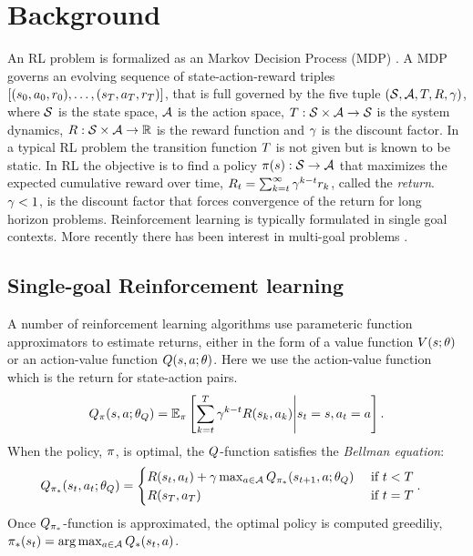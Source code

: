 \section{Background}

An RL problem is formalized as an Markov Decision Process (MDP)
\citep{sutton1998reinforcement}. A MDP governs
an evolving sequence of state-action-reward triples $[(s_0, a_0,
r_0), \dots, (s_T, a_T, r_T)]$, that is full governed
by the five tuple $(\mathcal{S}, \mathcal{A}, T, R, \gamma)$, where $\mathcal{S}$ is the
state space, $\mathcal{A}$ is the action space, $T : \mathcal{S} \times \mathcal{A}
\rightarrow \mathcal{S}$ is the system dynamics, $R : \mathcal{S} \times \mathcal{A}
\rightarrow \mathbb{R} $ is the reward function and $\gamma$ is the discount
factor.
In a typical RL problem the transition function $T$ is not given but is
known to be static.
In RL the objective is to find a policy $\pi(s): \mathcal{S}
\rightarrow \mathcal{A}$ that
maximizes the expected cumulative
reward over time, $R_t = \sum_{k=t}^{\infty} \gamma^{k-t}r_{k}$, called the
\emph{return}. $\gamma < 1$, is the discount factor that forces
convergence of the return for long horizon problems. 
Reinforcement learning is typically formulated in single goal
contexts. More recently there has been interest in multi-goal
problems
\citep{andrychowicz2017hindsight,pong2018temporal,plappert2018multi}.


\subsection{Single-goal Reinforcement learning}

A number of reinforcement learning algorithms use parameteric function
approximators to estimate returns, either in the form of a value function
$V(s; \theta)$ or an action-value function $Q(s, a; \theta)$.
Here we use the action-value function which is the return for
state-action pairs.  
%
\begin{align}
Q_\pi(s, a; \theta_Q) = \mathbb{E}_\pi\left[ \sum_{k=t}^T
  \gamma^{k-t} R(s_k, a_k)
  \middle| s_t = s, a_t = a \right] .
  \label{eq:q-def}
\end{align}%
%
When the policy, $\pi$, is optimal, the $Q$-function satisfies the
\emph{Bellman equation}:
%
\begin{align}
    Q_{\pi_*}(s_t, a_t; \theta_Q)
  &=
    \begin{cases}
        R(s_t, a_t) + \gamma \max_{a \in \mathcal{A}}
        Q_{\pi_*}(s_{t+1}, a; \theta_Q)
      & \text{ if } t < T
      \\
      R(s_T, a_T) & \text{ if } t = T
    \end{cases}.
  \label{eq:bellman}
\end{align}%
% 
Once $Q_{\pi_*}$-function is approximated, the optimal policy is
computed greediliy, $\pi_*(s_t) = \arg \max_{a \in \mathcal{A}} Q_*(s_t, a)$.

